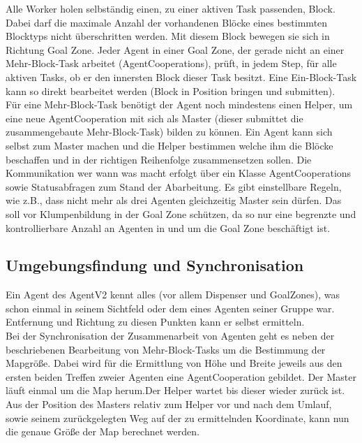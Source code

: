 \documentclass[runningheads]{llncs}
\begin{document}
Alle Worker holen selbständig einen, zu einer aktiven Task passenden, Block. Dabei darf die maximale Anzahl der vorhandenen Blöcke eines bestimmten Blocktyps nicht überschritten werden. Mit diesem Block bewegen sie sich in Richtung Goal Zone.
Jeder Agent in einer Goal Zone, der gerade nicht an einer Mehr-Block-Task arbeitet (AgentCooperations), prüft, in jedem Step, für alle aktiven Tasks, ob er den innersten Block dieser Task besitzt. Eine Ein-Block-Task kann so direkt bearbeitet werden (Block in Position bringen und submitten). \\

Für eine Mehr-Block-Task benötigt der Agent noch mindestens einen Helper, um eine neue AgentCooperation mit sich als Master (dieser submittet die zusammengebaute Mehr-Block-Task) bilden zu können. 
Ein Agent kann sich selbst zum Master machen und die Helper bestimmen welche ihm die Blöcke beschaffen und in der richtigen Reihenfolge zusammensetzen sollen.  
Die Kommunikation wer wann was macht erfolgt über ein Klasse AgentCooperations sowie Statusabfragen zum Stand der Abarbeitung. Es gibt einstellbare Regeln, wie z.B., dass nicht mehr als drei Agenten gleichzeitig Master sein dürfen. Das soll vor Klumpenbildung in der Goal Zone schützen, da so nur eine begrenzte und kontrollierbare Anzahl an Agenten in und um die Goal Zone beschäftigt ist.\\

\subsection{Umgebungsfindung und Synchronisation}
Ein Agent des AgentV2 kennt alles (vor allem Dispenser und GoalZones), was schon einmal in seinem Sichtfeld oder dem eines Agenten seiner Gruppe war. Entfernung und Richtung zu diesen Punkten kann er selbst ermitteln.\\

Bei der Synchronisation der Zusammenarbeit von Agenten  geht es neben der beschriebenen Bearbeitung von Mehr-Block-Tasks um die Bestimmung der Mapgröße. Dabei wird für die Ermittlung von Höhe und Breite jeweils aus den ersten beiden Treffen zweier Agenten eine AgentCooperation gebildet. Der Master läuft einmal um die Map herum.Der Helper wartet bis dieser wieder zurück ist. Aus der Position des Masters relativ zum Helper vor und nach dem Umlauf, sowie seinem zurückgelegten Weg auf der zu ermittelnden Koordinate, kann nun die genaue Größe der Map berechnet werden. 
\end{document}
